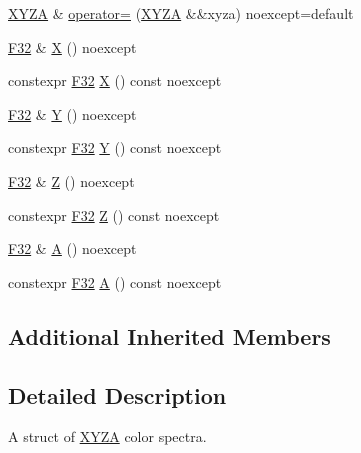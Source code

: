 \begin{DoxyCompactItemize}
\mbox{\hyperlink{structmage_1_1_x_y_z_a}{X\+Y\+ZA}} \& \mbox{\hyperlink{structmage_1_1_x_y_z_a_a54e3320e55516c1c0db38865a0036b47}{operator=}} (\mbox{\hyperlink{structmage_1_1_x_y_z_a}{X\+Y\+ZA}} \&\&xyza) noexcept=default
\item 
\mbox{\hyperlink{namespacemage_aa97e833b45f06d60a0a9c4fc22ae02c0}{F32}} \& \mbox{\hyperlink{structmage_1_1_x_y_z_a_a731e38b4d342c92c0652b8e08f396785}{X}} () noexcept
\item 
constexpr \mbox{\hyperlink{namespacemage_aa97e833b45f06d60a0a9c4fc22ae02c0}{F32}} \mbox{\hyperlink{structmage_1_1_x_y_z_a_a45b6cd64ef541319bf0d09d5574f4399}{X}} () const noexcept
\item 
\mbox{\hyperlink{namespacemage_aa97e833b45f06d60a0a9c4fc22ae02c0}{F32}} \& \mbox{\hyperlink{structmage_1_1_x_y_z_a_ad0bbe584ccf93f9b2d5b000c0edc9f54}{Y}} () noexcept
\item 
constexpr \mbox{\hyperlink{namespacemage_aa97e833b45f06d60a0a9c4fc22ae02c0}{F32}} \mbox{\hyperlink{structmage_1_1_x_y_z_a_a3d3769694e1ea68766c83917be2f020e}{Y}} () const noexcept
\item 
\mbox{\hyperlink{namespacemage_aa97e833b45f06d60a0a9c4fc22ae02c0}{F32}} \& \mbox{\hyperlink{structmage_1_1_x_y_z_a_ad2c3f7091955f36256c28ef5c31301e5}{Z}} () noexcept
\item 
constexpr \mbox{\hyperlink{namespacemage_aa97e833b45f06d60a0a9c4fc22ae02c0}{F32}} \mbox{\hyperlink{structmage_1_1_x_y_z_a_ac17cb31ebc0d375da6df6601d0096b72}{Z}} () const noexcept
\item 
\mbox{\hyperlink{namespacemage_aa97e833b45f06d60a0a9c4fc22ae02c0}{F32}} \& \mbox{\hyperlink{structmage_1_1_x_y_z_a_ac3680d370c4b74524aff2b64ec12a2e6}{A}} () noexcept
\item 
constexpr \mbox{\hyperlink{namespacemage_aa97e833b45f06d60a0a9c4fc22ae02c0}{F32}} \mbox{\hyperlink{structmage_1_1_x_y_z_a_a7be53362c6056b51902b2e811fdad133}{A}} () const noexcept
\end{DoxyCompactItemize}
\subsection*{Additional Inherited Members}


\subsection{Detailed Description}
A struct of \mbox{\hyperlink{structmage_1_1_x_y_z_a}{X\+Y\+ZA}} color spectra. 

